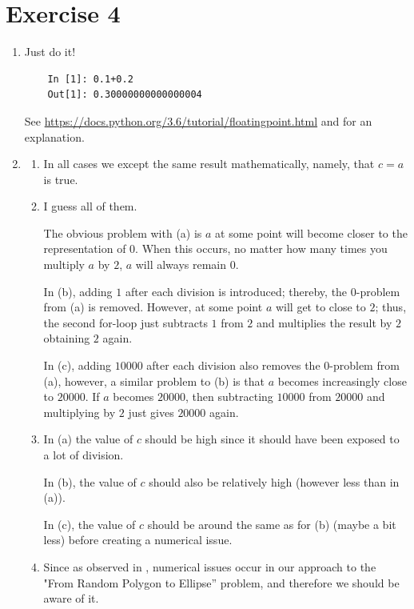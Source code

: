 \documentclass{article}
\begin{document}
\section*{Exercise 4}
\begin{enumerate}[label = (\arabic*)]
	\item Just do it!
	\begin{lstlisting}
	In [1]: 0.1+0.2
	Out[1]: 0.30000000000000004
	\end{lstlisting}
	
	See
        \url{https://docs.python.org/3.6/tutorial/floatingpoint.html}
        and \cite[p.~377]{stallings} for an explanation.
	
	\item 
	
	\begin{enumerate}[label = (\alph*)]
		\item In all cases we except the same result mathematically, namely, that $c = a$ is true.
		
		\item I guess all of them.
		
		The obvious problem with (a) is $a$ at some point will become closer to the representation of $0$. When this occurs, no matter how many times you multiply $a$ by $2$, $a$ will always remain $0$.
		
		In (b), adding $1$ after each division is introduced; thereby, the $0$-problem from (a) is removed. However, at some point $a$ will get to close to $2$; thus, the second for-loop just subtracts $1$ from $2$ and multiplies the result by $2$ obtaining $2$ again.
		
		In (c), adding $10000$ after each division also removes the $0$-problem from (a), however, a similar problem to (b) is that $a$ becomes increasingly close to $20000$. If $a$ becomes $20000$, then subtracting $10000$ from $20000$ and multiplying by $2$ just gives $20000$ again. 
		
		\item In (a) the value of $c$ should be high since it should have been exposed to a lot of division.
		
		In (b), the value of $c$ should also be relatively high (however less than in (a)). %
		
		In (c), the value of $c$ should be around the same as for (b) (maybe a bit less) before creating a numerical issue.
		
		\item Since as observed in \cite[p.~26-27]{random_polygon}, numerical issues occur in our approach to the "From Random Polygon to Ellipse” problem, and therefore we should be aware of it. 
	\end{enumerate}
\end{enumerate}


\clearpage


\end{document}
